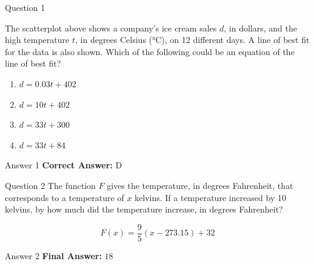 \documentclass{beamer}
\begin{document}
\begin{frame}{Question 1}
\small
\begin{center}

\end{center}

The scatterplot above shows a company’s ice cream sales $d$, in dollars, and the high temperature $t$, in degrees Celsius (°C), on 12 different days.  
A line of best fit for the data is also shown.  
Which of the following could be an equation of the line of best fit?
\vspace{0.35cm}
\begin{enumerate}
    \item[A.] $d = 0.03t + 402$
    \item[B.] $d = 10t + 402$
    \item[C.] $d = 33t + 300$
    \item[D.] $d = 33t + 84$
\end{enumerate}
\end{frame}
\begin{frame}{Answer 1}
\small
\textbf{Correct Answer:} D
\end{frame}

\begin{frame}{Question 2}
\small
The function \( F \) gives the temperature, in degrees Fahrenheit, that corresponds to a temperature of \( x \) kelvins. If a temperature increased by 10 kelvins, by how much did the temperature increase, in degrees Fahrenheit?

\[
F(x) = \frac{9}{5}(x - 273.15) + 32
\]
\end{frame}
\begin{frame}{Answer 2}
\small
\textbf{Final Answer:} $\boxed{18}$
\end{frame}
\end{document}
